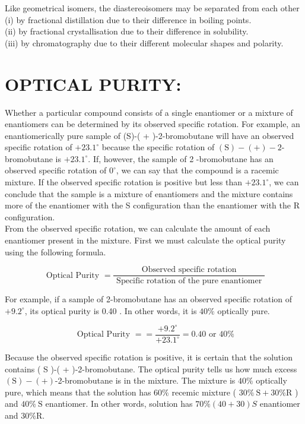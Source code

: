 \documentclass[10pt]{article}
\begin{document}
Like geometrical isomers, the diastereoisomers may be separated from each other\\
(i) by fractional distillation due to their difference in boiling points.\\
(ii) by fractional crystallisation due to their difference in solubility.\\
(iii) by chromatography due to their different molecular shapes and polarity.

\section*{OPTICAL PURITY:}
Whether a particular compound consists of a single enantiomer or a mixture of enantiomers can be determined by its observed specific rotation. For example, an enantiomerically pure sample of (S)-( + )-2-bromobutane will have an observed specific rotation of $+23.1^{\circ}$ because the specific rotation of $(\mathrm{S})-(+)-2$-bromobutane is $+23.1^{\circ}$. If, however, the sample of 2 -bromobutane has an observed specific rotation of $0^{\circ}$, we can say that the compound is a racemic mixture. If the observed specific rotation is positive but less than $+23.1^{\circ}$, we can conclude that the sample is a mixture of enantiomers and the mixture contains more of the enantiomer with the S configuration than the enantiomer with the R configuration.\\
From the observed specific rotation, we can calculate the amount of each enantiomer present in the mixture. First we must calculate the optical purity using the following formula.

$$
\text { Optical Purity }=\frac{\text { Observed specific rotation }}{\text { Specific rotation of the pure enantiomer }}
$$

For example, if a sample of 2-bromobutane has an observed specific rotation of $+9.2^{\circ}$, its optical purity is 0.40 . In other words, it is $40 \%$ optically pure.

$$
\text { Optical Purity }==\frac{+9.2^{\circ}}{+23.1^{\circ}}=0.40 \text { or } 40 \%
$$

Because the observed specific rotation is positive, it is certain that the solution contains ( S )-( + )-2-bromobutane. The optical purity tells us how much excess $(\mathrm{S})-(+)$-2-bromobutane is in the mixture. The mixture is $40 \%$ optically pure, which means that the solution has $60 \%$ recemic mixture ( $30 \% \mathrm{~S}+30 \% \mathrm{R}$ ) and $40 \% \mathrm{~S}$ enantiomer. In other words, solution has $70 \%(40+30) S$ enantiomer and $30 \% \mathrm{R}$.
\end{document}
